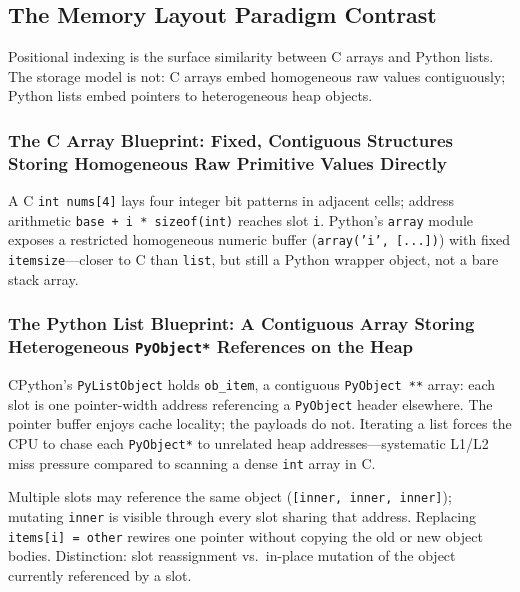 \subsection{The Memory Layout Paradigm Contrast}

Positional indexing is the surface similarity between C arrays and Python lists. The storage model is not: C arrays embed homogeneous raw values contiguously; Python lists embed pointers to heterogeneous heap objects.

\subsubsection{The C Array Blueprint: Fixed, Contiguous Structures Storing Homogeneous Raw Primitive Values Directly}

A C \texttt{int nums[4]} lays four integer bit patterns in adjacent cells; address arithmetic \texttt{base + i * sizeof(int)} reaches slot \texttt{i}. Python's \texttt{array} module exposes a restricted homogeneous numeric buffer (\texttt{array('i', [...])}) with fixed \texttt{itemsize}---closer to C than \texttt{list}, but still a Python wrapper object, not a bare stack array.

\subsubsection{The Python List Blueprint: A Contiguous Array Storing Heterogeneous \texttt{PyObject*} References on the Heap}

CPython's \texttt{PyListObject} holds \texttt{ob\_item}, a contiguous \texttt{PyObject **} array: each slot is one pointer-width address referencing a \texttt{PyObject} header elsewhere. The pointer buffer enjoys cache locality; the payloads do not. Iterating a list forces the CPU to chase each \texttt{PyObject*} to unrelated heap addresses---systematic L1/L2 miss pressure compared to scanning a dense \texttt{int} array in C.

Multiple slots may reference the same object (\texttt{[inner, inner, inner]}); mutating \texttt{inner} is visible through every slot sharing that address. Replacing \texttt{items[i] = other} rewires one pointer without copying the old or new object bodies. Distinction: slot reassignment vs.\ in-place mutation of the object currently referenced by a slot.
